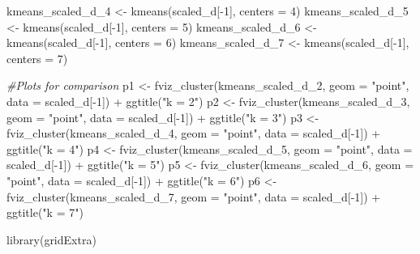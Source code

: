 \documentclass[
]{article}
\newenvironment{Shaded}{\begin{snugshade}}{\end{snugshade}}
\newcommand{\AttributeTok}[1]{\textcolor[rgb]{0.77,0.63,0.00}{#1}}
\newcommand{\CommentTok}[1]{\textcolor[rgb]{0.56,0.35,0.01}{\textit{#1}}}
\newcommand{\DecValTok}[1]{\textcolor[rgb]{0.00,0.00,0.81}{#1}}
\newcommand{\FunctionTok}[1]{\textcolor[rgb]{0.00,0.00,0.00}{#1}}
\newcommand{\NormalTok}[1]{#1}
\newcommand{\OtherTok}[1]{\textcolor[rgb]{0.56,0.35,0.01}{#1}}
\newcommand{\SpecialCharTok}[1]{\textcolor[rgb]{0.00,0.00,0.00}{#1}}
\newcommand{\StringTok}[1]{\textcolor[rgb]{0.31,0.60,0.02}{#1}}
\begin{document}
\begin{Shaded}
\begin{Highlighting}[]
\NormalTok{kmeans\_scaled\_d\_4 }\OtherTok{\textless{}{-}} \FunctionTok{kmeans}\NormalTok{(scaled\_d[}\SpecialCharTok{{-}}\DecValTok{1}\NormalTok{], }\AttributeTok{centers =} \DecValTok{4}\NormalTok{)}
\NormalTok{kmeans\_scaled\_d\_5 }\OtherTok{\textless{}{-}} \FunctionTok{kmeans}\NormalTok{(scaled\_d[}\SpecialCharTok{{-}}\DecValTok{1}\NormalTok{], }\AttributeTok{centers =} \DecValTok{5}\NormalTok{)}
\NormalTok{kmeans\_scaled\_d\_6 }\OtherTok{\textless{}{-}} \FunctionTok{kmeans}\NormalTok{(scaled\_d[}\SpecialCharTok{{-}}\DecValTok{1}\NormalTok{], }\AttributeTok{centers =} \DecValTok{6}\NormalTok{)}
\NormalTok{kmeans\_scaled\_d\_7 }\OtherTok{\textless{}{-}} \FunctionTok{kmeans}\NormalTok{(scaled\_d[}\SpecialCharTok{{-}}\DecValTok{1}\NormalTok{], }\AttributeTok{centers =} \DecValTok{7}\NormalTok{)}

\CommentTok{\#Plots for comparison}
\NormalTok{p1 }\OtherTok{\textless{}{-}} \FunctionTok{fviz\_cluster}\NormalTok{(kmeans\_scaled\_d\_2, }\AttributeTok{geom =} \StringTok{"point"}\NormalTok{, }\AttributeTok{data =}\NormalTok{ scaled\_d[}\SpecialCharTok{{-}}\DecValTok{1}\NormalTok{]) }\SpecialCharTok{+} \FunctionTok{ggtitle}\NormalTok{(}\StringTok{"k = 2"}\NormalTok{)}
\NormalTok{p2 }\OtherTok{\textless{}{-}} \FunctionTok{fviz\_cluster}\NormalTok{(kmeans\_scaled\_d\_3, }\AttributeTok{geom =} \StringTok{"point"}\NormalTok{,  }\AttributeTok{data =}\NormalTok{ scaled\_d[}\SpecialCharTok{{-}}\DecValTok{1}\NormalTok{]) }\SpecialCharTok{+} \FunctionTok{ggtitle}\NormalTok{(}\StringTok{"k = 3"}\NormalTok{)}
\NormalTok{p3 }\OtherTok{\textless{}{-}} \FunctionTok{fviz\_cluster}\NormalTok{(kmeans\_scaled\_d\_4, }\AttributeTok{geom =} \StringTok{"point"}\NormalTok{,  }\AttributeTok{data =}\NormalTok{ scaled\_d[}\SpecialCharTok{{-}}\DecValTok{1}\NormalTok{]) }\SpecialCharTok{+} \FunctionTok{ggtitle}\NormalTok{(}\StringTok{"k = 4"}\NormalTok{)}
\NormalTok{p4 }\OtherTok{\textless{}{-}} \FunctionTok{fviz\_cluster}\NormalTok{(kmeans\_scaled\_d\_5, }\AttributeTok{geom =} \StringTok{"point"}\NormalTok{,  }\AttributeTok{data =}\NormalTok{ scaled\_d[}\SpecialCharTok{{-}}\DecValTok{1}\NormalTok{]) }\SpecialCharTok{+} \FunctionTok{ggtitle}\NormalTok{(}\StringTok{"k = 5"}\NormalTok{)}
\NormalTok{p5 }\OtherTok{\textless{}{-}} \FunctionTok{fviz\_cluster}\NormalTok{(kmeans\_scaled\_d\_6, }\AttributeTok{geom =} \StringTok{"point"}\NormalTok{,  }\AttributeTok{data =}\NormalTok{ scaled\_d[}\SpecialCharTok{{-}}\DecValTok{1}\NormalTok{]) }\SpecialCharTok{+} \FunctionTok{ggtitle}\NormalTok{(}\StringTok{"k = 6"}\NormalTok{)}
\NormalTok{p6 }\OtherTok{\textless{}{-}} \FunctionTok{fviz\_cluster}\NormalTok{(kmeans\_scaled\_d\_7, }\AttributeTok{geom =} \StringTok{"point"}\NormalTok{,  }\AttributeTok{data =}\NormalTok{ scaled\_d[}\SpecialCharTok{{-}}\DecValTok{1}\NormalTok{]) }\SpecialCharTok{+} \FunctionTok{ggtitle}\NormalTok{(}\StringTok{"k = 7"}\NormalTok{)}

\FunctionTok{library}\NormalTok{(gridExtra)}
\end{Highlighting}
\end{Shaded}
\end{document}
